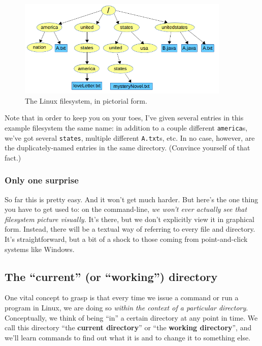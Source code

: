\begin{figure}[ht]
\centering
\includegraphics[width=0.9\textwidth]{tree.png}  %
\caption{The Linux filesystem, in pictorial form.}
\label{fig:tree}
\end{figure}

Note that in order to keep you on your toes, I've given several entries in
this example filesystem the same name: in addition to a couple different
\texttt{america}s, we've got several \texttt{states}, multiple different
\texttt{A.txt}s, etc. In no case, however, are the duplicately-named entries
in the same directory. (Convince yourself of that fact.)

\subsubsection{Only one surprise}

So far this is pretty easy. And it won't get much harder. But here's the one
thing you have to get used to: on the command-line, \textit{we won't ever
actually see that filesystem picture visually.} It's there, but we don't
explicitly view it in graphical form. Instead, there will be a textual way of
referring to every file and directory. It's straightforward, but a bit of a
shock to those coming from point-and-click systems like Windows.

\subsection{The ``current'' (or ``working'') directory}

One vital concept to grasp is that every time we issue a command or run a
program in Linux, we are doing so \textit{within the context of a particular
directory}. Conceptually, we think of being ``in'' a certain directory at any
point in time. We call this directory ``the \textbf{current directory}'' or
``the \textbf{working directory}'', and we'll learn commands to find out what
it is and to change it to something else.


